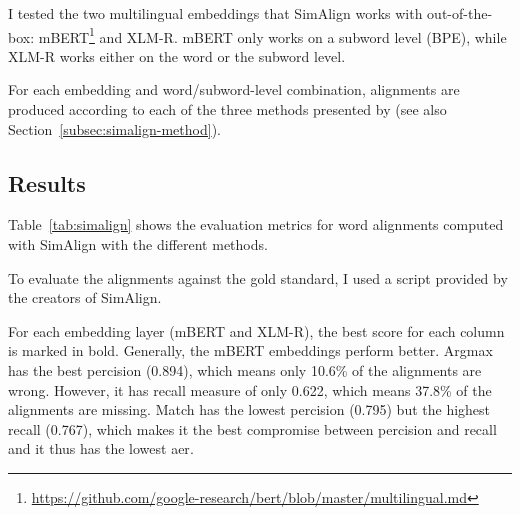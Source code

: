 I tested the two multilingual embeddings that SimAlign works with out-of-the-box: mBERT\footnote{\url{https://github.com/google-research/bert/blob/master/multilingual.md}} and XLM-R\autocite{conneau-etal-2020-xlm}. 
mBERT only works on a subword level (BPE), while XLM-R works either on the word or the subword level. 

For each embedding and word/subword-level combination, alignments are produced according to each of the three methods presented by \cite{jalili-sabet-etal-2020-simalign} (see also Section~\ref{subsec:simalign-method}).

\subsection{Results}
Table~\ref{tab:simalign} shows the evaluation metrics for word alignments computed with SimAlign with the different methods.

To evaluate the alignments against the gold standard, I used a script provided by the creators of SimAlign\footnotemark.
 
For each embedding layer (mBERT and XLM-R), the best score for each column is marked in bold. 
Generally, the mBERT embeddings perform better. 
Argmax has the best percision (0.894), which means only 10.6\% of the alignments are wrong. 
However, it has \gls{recall} measure of only 0.622, which means 37.8\% of the alignments are missing.
Match has the lowest percision (0.795) but the highest recall (0.767), which makes it the best compromise between percision and recall and it thus has the lowest \acrshort{aer}.

